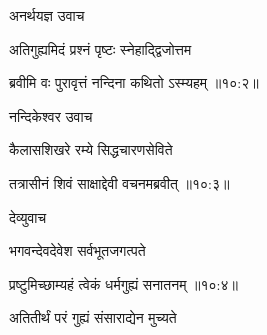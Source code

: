 {\devanagarifont अनर्थयज्ञ उवाच {\dandab}\dontdisplaylinenum  }%
 
{\devanagarifont अतिगुह्यमिदं प्रश्नं पृष्टः स्नेहाद्द्विजोत्तम \thinspace{\danda} \dontdisplaylinenum }%


{\devanagarifont ब्रवीमि वः पुरावृत्तं नन्दिना कथितो ऽस्म्यहम् {॥१०:२॥} \veg\dontdisplaylinenum }%

{\devanagarifont नन्दिकेश्वर उवाच {\dandab}\dontdisplaylinenum  }%

{\devanagarifont कैलासशिखरे रम्ये सिद्धचारणसेविते \thinspace{\danda} \dontdisplaylinenum }%


{\devanagarifont तत्रासीनं शिवं साक्षाद्देवी वचनमब्रवीत् {॥१०:३॥} \veg\dontdisplaylinenum }%
 
{\devanagarifont देव्युवाच {\dandab}\dontdisplaylinenum  }%
 
{\devanagarifont भगवन्देवदेवेश सर्वभूतजगत्पते \thinspace{\danda} \dontdisplaylinenum }%


{\devanagarifont प्रष्टुमिच्छाम्यहं त्वेकं धर्मगुह्यं सनातनम् {॥१०:४॥} \veg\dontdisplaylinenum }%

{\devanagarifont अतितीर्थं परं गुह्यं संसाराद्येन मुच्यते \thinspace{\dandab} \dontdisplaylinenum }%



